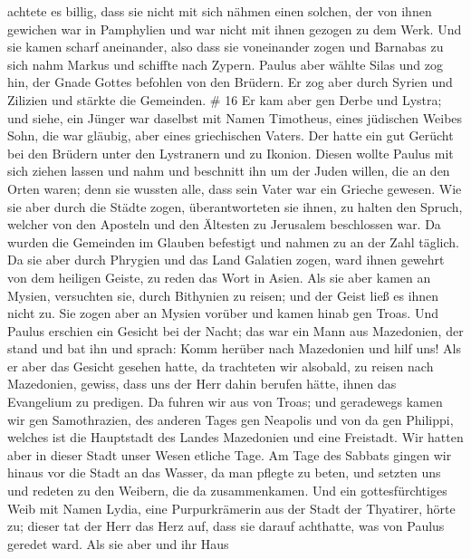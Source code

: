 achtete es billig, dass sie nicht mit sich nähmen einen solchen, der von
ihnen gewichen war in Pamphylien und war nicht mit ihnen gezogen zu dem
Werk.  Und sie kamen scharf aneinander, also dass sie
voneinander zogen und Barnabas zu sich nahm Markus und schiffte nach
Zypern.  Paulus aber wählte Silas und zog hin, der Gnade
Gottes befohlen von den Brüdern.  Er zog aber durch Syrien
und Zilizien und stärkte die Gemeinden. \# 16  Er kam aber
gen Derbe und Lystra; und siehe, ein Jünger war daselbst mit Namen
Timotheus, eines jüdischen Weibes Sohn, die war gläubig, aber eines
griechischen Vaters.  Der hatte ein gut Gerücht bei den
Brüdern unter den Lystranern und zu Ikonion.  Diesen wollte
Paulus mit sich ziehen lassen und nahm und beschnitt ihn um der Juden
willen, die an den Orten waren; denn sie wussten alle, dass sein Vater
war ein Grieche gewesen.  Wie sie aber durch die Städte
zogen, überantworteten sie ihnen, zu halten den Spruch, welcher von den
Aposteln und den Ältesten zu Jerusalem beschlossen war.  Da
wurden die Gemeinden im Glauben befestigt und nahmen zu an der Zahl
täglich.  Da sie aber durch Phrygien und das Land Galatien
zogen, ward ihnen gewehrt von dem heiligen Geiste, zu reden das Wort in
Asien.  Als sie aber kamen an Mysien, versuchten sie, durch
Bithynien zu reisen; und der Geist ließ es ihnen nicht zu. 
Sie zogen aber an Mysien vorüber und kamen hinab gen Troas. 
Und Paulus erschien ein Gesicht bei der Nacht; das war ein Mann aus
Mazedonien, der stand und bat ihn und sprach: Komm herüber nach
Mazedonien und hilf uns!  Als er aber das Gesicht gesehen
hatte, da trachteten wir alsobald, zu reisen nach Mazedonien, gewiss,
dass uns der Herr dahin berufen hätte, ihnen das Evangelium zu predigen.
 Da fuhren wir aus von Troas; und geradewegs kamen wir gen
Samothrazien, des anderen Tages gen Neapolis  und von da
gen Philippi, welches ist die Hauptstadt des Landes Mazedonien und eine
Freistadt. Wir hatten aber in dieser Stadt unser Wesen etliche Tage.
 Am Tage des Sabbats gingen wir hinaus vor die Stadt an das
Wasser, da man pflegte zu beten, und setzten uns und redeten zu den
Weibern, die da zusammenkamen.  Und ein gottesfürchtiges
Weib mit Namen Lydia, eine Purpurkrämerin aus der Stadt der Thyatirer,
hörte zu; dieser tat der Herr das Herz auf, dass sie darauf achthatte,
was von Paulus geredet ward.  Als sie aber und ihr Haus

